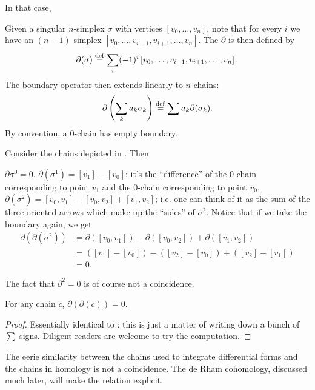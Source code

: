 In that case,
\begin{definition}
	Given a singular $n$-simplex $\sigma$ with vertices $[v_0, \dots, v_n]$,
	note that for every $i$ we have an $(n-1)$ simplex $[v_0, \dots, v_{i-1}, v_{i+1}, \dots, v_n]$.
	The  $\partial$ is then defined by
	\[ \partial(\sigma) \overset{\mathrm{def}}{=} \sum_i (-1)^i
		\left[ v_0, \dots, v_{i-1}, v_{i+1}, \dots, v_n \right]. \]
	The boundary operator then extends linearly to $n$-chains:
	\[ \partial\left( \sum_k a_k \sigma_k \right) \overset{\mathrm{def}}{=} \sum a_k \partial(\sigma_k). \]
	By convention, a $0$-chain has empty boundary.
\end{definition}
\begin{example}
	Consider the chains depicted in . Then
	\begin{enumerate}[(a)]
		\ii $\partial\sigma^0 = 0$.
		\ii $\partial(\sigma^1) = [v_1] - [v_0]$:
		it's the ``difference'' of the $0$-chain corresponding to point $v_1$
		and the $0$-chain corresponding to point $v_0$.
		\ii $\partial(\sigma^2) = [v_0,v_1] - [v_0,v_2] + [v_1, v_2]$;
		i.e. one can think of it as the sum of the three oriented arrows
		which make up the ``sides'' of $\sigma^2$.
		\ii Notice that if we take the boundary again, we get
		\begin{align*}
			\partial(\partial(\sigma^2))
			&= \partial([v_0,v_1]) - \partial([v_0,v_2]) + \partial([v_1,v_2]) \\
			&= \left( [v_1]-[v_0] \right) - \left( [v_2]-[v_0] \right) + \left( [v_2]-[v_1] \right)  \\
			&= 0.
		\end{align*}
	\end{enumerate}
\end{example}

The fact that $\partial^2 = 0$ is of course not a coincidence.
\begin{theorem}
	[$\partial^2=0$]
	For any chain $c$, $\partial(\partial(c)) = 0$.
\end{theorem}
\begin{proof}
	Essentially identical to :
	this is just a matter of writing down a bunch of $\sum$ signs.
	Diligent readers are welcome to try the computation.
\end{proof}
\begin{remark}
	The eerie similarity between the chains used to integrate differential forms
	and the chains in homology is not a coincidence.
	The de Rham cohomology, discussed much later, will make the relation explicit.
\end{remark}

